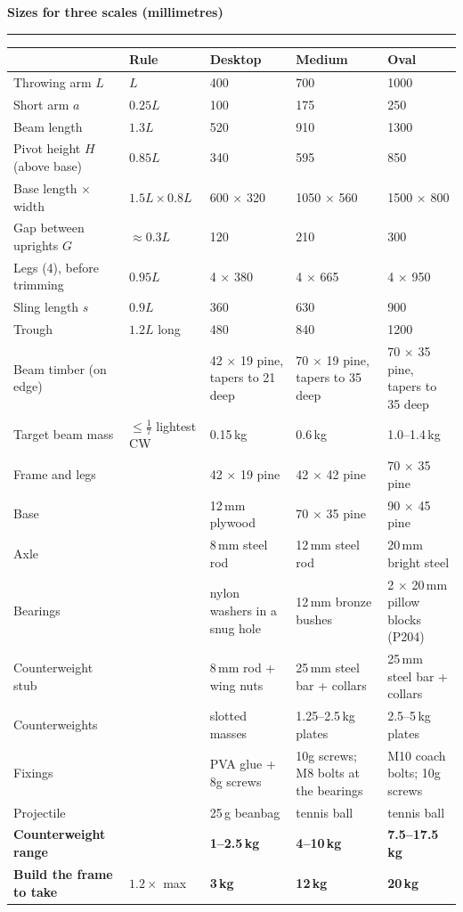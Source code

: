 \documentclass[11pt,a4paper]{article}
\newcommand{\sechead}[1]{%
  \par\vspace{6pt}%
  {\bfseries\large\color{HeadGrey} #1}\\[-4pt]
  {\color{RuleGrey}\rule{\linewidth}{0.8pt}}\par\vspace{1pt}
}
\begin{document}
\newpage
\sechead{Sizes for three scales (millimetres)}
{\footnotesize
\begin{tabularx}{\linewidth}{@{}L{3.6cm} L{2.0cm} *{3}{Y}@{}}
\toprule
 & \textbf{Rule} & \textbf{Desktop} & \textbf{Medium} & \textbf{Oval} \\
\midrule
Throwing arm $L$ & $L$ & 400 & 700 & 1000 \\
Short arm $a$ & $0.25L$ & 100 & 175 & 250 \\
Beam length & $1.3L$ & 520 & 910 & 1300 \\
Pivot height $H$ (above base) & $0.85L$ & 340 & 595 & 850 \\
Base length $\times$ width & $1.5L \times 0.8L$ & 600 $\times$ 320 & 1050 $\times$ 560 & 1500 $\times$ 800 \\
Gap between uprights $G$ & $\approx 0.3L$ & 120 & 210 & 300 \\
Legs (4), before trimming & $0.95L$ & 4 $\times$ 380 & 4 $\times$ 665 & 4 $\times$ 950 \\
Sling length $s$ & $0.9L$ & 360 & 630 & 900 \\
Trough & $1.2L$ long & 480 & 840 & 1200 \\
\midrule
Beam timber (on edge) & & 42 $\times$ 19 pine, tapers to 21 deep & 70 $\times$ 19 pine, tapers to 35 deep & 70 $\times$ 35 pine, tapers to 35 deep \\
Target beam mass & $\le \tfrac{1}{7}$ lightest CW & 0.15\,kg & 0.6\,kg & 1.0--1.4\,kg \\
Frame and legs & & 42 $\times$ 19 pine & 42 $\times$ 42 pine & 70 $\times$ 35 pine \\
Base & & 12\,mm plywood & 70 $\times$ 35 pine & 90 $\times$ 45 pine \\
Axle & & 8\,mm steel rod & 12\,mm steel rod & 20\,mm bright steel \\
Bearings & & nylon washers in a snug hole & 12\,mm bronze bushes & 2 $\times$ 20\,mm pillow blocks (P204) \\
Counterweight stub & & 8\,mm rod + wing nuts & 25\,mm steel bar + collars & 25\,mm steel bar + collars \\
Counterweights & & slotted masses & 1.25--2.5\,kg plates & 2.5--5\,kg plates \\
Fixings & & PVA glue + 8g screws & 10g screws; M8 bolts at the bearings & M10 coach bolts; 10g screws \\
Projectile & & 25\,g beanbag & tennis ball & tennis ball \\
\midrule
\textbf{Counterweight range} & & \textbf{1--2.5\,kg} & \textbf{4--10\,kg} & \textbf{7.5--17.5\,kg} \\
\textbf{Build the frame to take} & $1.2\times$ max & \textbf{3\,kg} & \textbf{12\,kg} & \textbf{20\,kg} \\
\bottomrule
\end{tabularx}}
\end{document}
